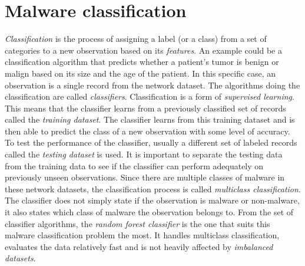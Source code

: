\documentclass{article}
\begin{document}
  \section{Malware classification}
    {\it Classification} is the process of assigning a label (or a class) from a set of categories to a new observation based on its {\it features}. An example could be a classification algorithm that predicts whether a patient's tumor is benign or malign based on its size and the age of the patient. In this specific case, an observation is a single record from the network dataset. The algorithms doing the classification are called {\it classifiers}. Classification is a form of {\it supervised learning}. This means that the classifier learns from a previously classified set of records called the {\it training dataset}. The classifier learns from this training dataset and is then able to predict the class of a new observation with some level of accuracy. To test the performance of the classifier, usually a different set of labeled records called the {\it testing dataset} is used. It is important to separate the testing data from the training data to see if the classifier can perform adequately on previously unseen observations. Since there are multiple classes of malware in these network datasets, the classification process is called {\it multiclass classification}. The classifier does not simply state if the observation is malware or non-malware, it also states which class of malware the observation belongs to. From the set of classifier algorithms, the {\it random forest classifier} is the one that suits this malware classification problem the most. It handles multiclass classification, evaluates the data relatively fast and is not heavily affected by {\it imbalanced datasets}.
\end{document}
